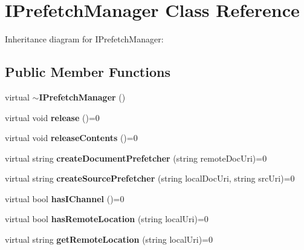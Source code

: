 \section{IPrefetchManager Class Reference}
\label{classbr_1_1pucrio_1_1telemidia_1_1ginga_1_1ncl_1_1prefetch_1_1IPrefetchManager}
Inheritance diagram for IPrefetchManager:\subsection*{Public Member Functions}
\begin{CompactItemize}
\item 
virtual {\bf $\sim$IPrefetchManager} ()\label{classbr_1_1pucrio_1_1telemidia_1_1ginga_1_1ncl_1_1prefetch_1_1IPrefetchManager_35fa42a00c257747035741b8a1a7cdd0}

\item 
virtual void \textbf{release} ()=0\label{classbr_1_1pucrio_1_1telemidia_1_1ginga_1_1ncl_1_1prefetch_1_1IPrefetchManager_ab0a52fdd148a54108e7bf49287d7c47}

\item 
virtual void \textbf{releaseContents} ()=0\label{classbr_1_1pucrio_1_1telemidia_1_1ginga_1_1ncl_1_1prefetch_1_1IPrefetchManager_7d34cffdef1e41a29dc81eaff55b35d9}

\item 
virtual string \textbf{createDocumentPrefetcher} (string remoteDocUri)=0\label{classbr_1_1pucrio_1_1telemidia_1_1ginga_1_1ncl_1_1prefetch_1_1IPrefetchManager_b0c96be187ff486436481ebfef3424f6}

\item 
virtual string \textbf{createSourcePrefetcher} (string localDocUri, string srcUri)=0\label{classbr_1_1pucrio_1_1telemidia_1_1ginga_1_1ncl_1_1prefetch_1_1IPrefetchManager_a162044f8cebcf41c97435740eba1f6c}

\item 
virtual bool \textbf{hasIChannel} ()=0\label{classbr_1_1pucrio_1_1telemidia_1_1ginga_1_1ncl_1_1prefetch_1_1IPrefetchManager_17403fe2286745394a8de3de90e48b5e}

\item 
virtual bool \textbf{hasRemoteLocation} (string localUri)=0\label{classbr_1_1pucrio_1_1telemidia_1_1ginga_1_1ncl_1_1prefetch_1_1IPrefetchManager_d5581a6fe17650cf1e266684ed582147}

\item 
virtual string \textbf{getRemoteLocation} (string localUri)=0\label{classbr_1_1pucrio_1_1telemidia_1_1ginga_1_1ncl_1_1prefetch_1_1IPrefetchManager_d6e1398d3dc5156611b9dff1bb9da814}


\end{CompactItemize}
